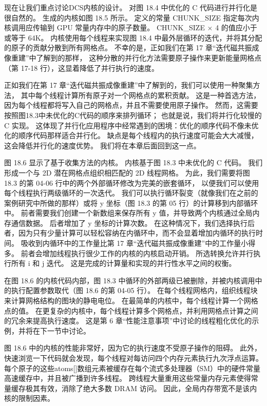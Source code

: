 现在让我们重点讨论DCS内核的设计。 对图 18.4 中优化的 C 代码进行并行化是很自然的。 生成的内核如图 18.5 所示。 
定义的常量 CHUNK\_SIZE 指定每次内核调用应传输到 GPU 常量内存中的原子数量。 CHUNK\_SIZE × 4 的值应小于或等于 64K。 
内核使用每个线程来实现图 18.4 中最外层循环的迭代，并将其分配的原子的贡献分散到所有网格点。 
不幸的是，正如我们在第 17 章“迭代磁共振成像重建”中了解到的那样，
这种分散的并行化方法需要原子操作来更新能量网格点（第 17-18 行），这显着降低了并行执行的速度。

正如我们在第 17 章“迭代磁共振成像重建”中了解到的，我们可以使用一种聚集方法，
其中每个线程计算所有原子对一个网格点的累积贡献。 
这是一种首选方法，因为每个线程都将写入自己的网格点，并且不需要使用原子操作。 
然而，这需要按照图18.3中未优化的C代码的顺序来排列循环； 也就是说，我们将并行化较慢的 C 实现。 
这体现了并行化应用程序中经常遇到的困境：优化的顺序代码不像未优化的顺序代码那样适合并行化。 
缺点是每个线程内的执行速度可能会大大减慢，这会降低并行化的速度优势。 我们将在本章后面回到这一点。

图 18.6 显示了基于收集方法的内核。 内核基于图 18.3 中未优化的 C 代码。 
我们形成一个与 2D 潜在网格点组织相匹配的 2D 线程网格。 
为此，我们需要将图 18.3 的第 04-06 行中的两个外部循环修改为完美的嵌套循环，
以便我们可以使用每个线程执行两级循环的一次迭代。 
我们可以执行循环裂变（就像我们在之前的案例研究中所做的那样）或将 y 坐标（图 18.3 的第 05 行）的计算移到内部循环中。 
前者需要我们创建一个新数组来保存所有 y 值，并导致两个内核通过全局内存通信数据。 后者增加了 y 坐标的计算次数。 
在这种情况下，我们选择执行后者，因为只有少量计算可以轻松容纳在内循环中，而不会显着增加内循环的执行时间。 
吸收到内循环中的工作量比第 17 章“迭代磁共振成像重建”中的工作量小得多。 前者会增加线程执行很少工作的内核的内核启动开销。 
所选转换允许并行执行所有 i 和 j 迭代。 这是完成的计算量和实现的并行性水平之间的权衡。

在图 18.6 的内核代码内部，图 18.3 中循环的外部两级已被删除，并被内核调用中的执行配置参数取代（图 18.6 的第 04-05 行）。 
在每个线程网格内，组织线程块来计算网格结构的图块的静电电位。 在最简单的内核中，每个线程计算一个网格点的值。 
在更复杂的内核中，每个线程计算多个网格点，并利用网格点计算之间的冗余来提高执行速度。 
这是第 6 章“性能注意事项”中讨论的线程粗化优化的示例，并将在下一节中讨论。

图 18.6 中的内核的性能非常好，因为它的执行速度不受原子操作的阻碍。 
此外，快速浏览一下代码就会发现，每个线程对每访问四个内存元素执行九次浮点运算。 
每个原子的这些atoms[]数组元素被缓存在每个流式多处理器（SM）中的硬件常量高速缓存中，并且被广播到许多线程。 
跨线程大量重用这些常量内存元素使得常量缓存极其有效，消除了绝大多数 DRAM 访问。 
因此，全局内存带宽不是该内核的限制因素。

